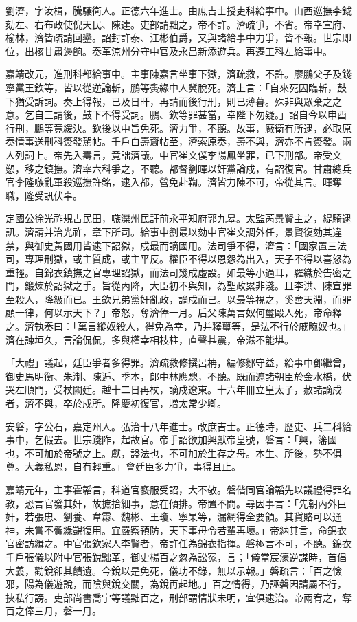 \begin{pinyinscope}
劉濟，字汝楫，騰驤衛人。正德六年進士。由庶吉士授吏科給事中。山西巡撫李鉞劾左、右布政使倪天民、陳達。吏部請黜之，帝不許。濟疏爭，不省。帝幸宣府、榆林，濟皆疏請回鑾。詔封許泰、江彬伯爵，又與諸給事中力爭，皆不報。世宗即位，出核甘肅邊餉。奏革涼州分守中官及永昌新添遊兵。再遷工科左給事中。

嘉靖改元，進刑科都給事中。主事陳嘉言坐事下獄，濟疏救，不許。廖鵬父子及錢寧黨王欽等，皆以從逆論斬，鵬等夤緣中人冀脫死。濟上言：「自來死囚臨斬，鼓下猶受訴詞。奏上得報，已及日旰，再請而後行刑，則已薄暮。殊非與眾棄之之意。乞自三請後，鼓下不得受詞。鵬、欽等罪甚當，幸陛下勿疑。」詔自今以申酉行刑，鵬等竟緩決。欽後以中旨免死。濟力爭，不聽。故事，廠衛有所逮，必取原奏情事送刑科簽發駕帖。千戶白壽齎帖至，濟索原奏，壽不與，濟亦不肯簽發。兩人列詞上。帝先入壽言，竟詘濟議。中官崔文僕李陽鳳坐罪，已下刑部。帝受文愬，移之鎮撫。濟率六科爭之，不聽。都督劉暉以奸黨論戍，有詔復官。甘肅總兵官李隆嗾亂軍殺巡撫許銘，逮入都，營免赴鞫。濟皆力陳不可，帝從其言。暉奪職，隆受訊伏辜。

定國公徐光祚規占民田，嗾灤州民訐前永平知府郭九皋。太監芮景賢主之，緹騎逮訊。濟請并治光祚，章下所司。給事中劉最以劾中官崔文調外任，景賢復劾其違禁，與御史黃國用皆逮下詔獄，戍最而謫國用。法司爭不得，濟言：「國家置三法司，專理刑獄，或主質成，或主平反。權臣不得以恩怨為出入，天子不得以喜怒為重輕。自錦衣鎮撫之官專理詔獄，而法司幾成虛設。如最等小過耳，羅織於告密之門，鍛煉於詔獄之手。旨從內降，大臣初不與知，為聖政累非淺。且李洪、陳宣罪至殺人，降級而已。王欽兄弟黨奸亂政，謫戍而已。以最等視之，奚啻天淵，而罪顧一律，何以示天下？」帝怒，奪濟俸一月。后父陳萬言奴何璽毆人死，帝命釋之。濟執奏曰：「萬言縱奴殺人，得免為幸，乃并釋璽等，是法不行於戚畹奴也。」濟在諫垣久，言論侃侃，多與權幸相枝柱，直聲甚震，帝滋不能堪。

「大禮」議起，廷臣爭者多得罪。濟疏救修撰呂柟，編修鄒守益，給事中鄧繼曾，御史馬明衡、朱淛、陳逅、季本，郎中林應驄，不聽。既而遮諸朝臣於金水橋，伏哭左順門，受杖闕廷。越十二日再杖，謫戍遼東。十六年冊立皇太子，赦諸謫戍者，濟不與，卒於戍所。隆慶初復官，贈太常少卿。

安磐，字公石，嘉定州人。弘治十八年進士。改庶吉士。正德時，歷吏、兵二科給事中，乞假去。世宗踐阼，起故官。帝手詔欲加興獻帝皇號，磐言：「興，籓國也，不可加於帝號之上。獻，謚法也，不可加於生存之母。本生、所後，勢不俱尊。大義私恩，自有輕重。」會廷臣多力爭，事得且止。

嘉靖元年，主事霍韜言，科道官褻服受詔，大不敬。磐偕同官論韜先以議禮得罪名教，恐言官發其奸，故摭拾細事，意在傾排。帝置不問。尋因事言：「先朝內外巨奸，若張忠、劉養、韋霦、魏彬、王瓊、寧杲等，漏網得全要領。其貨賂可以通神，未嘗不夤緣覬復用。宜嚴察預防，天下事毋令若輩再壞。」帝納其言，命錦衣官密訪緝之。中官張欽家人李賢者，帝許任為錦衣指揮。磐極言不可，不聽。錦衣千戶張儀以附中官張銳黜革，御史楊百之忽為訟冤，言；「儀當宸濠逆謀時，首倡大義，勸銳卻其饋遺。今銳以是免死，儀功不錄，無以示報。」磐疏言：「百之憸邪，陽為儀遊說，而陰與銳交關，為銳再起地。」百之情得，乃誣磐因請屬不行，挾私行謗。吏部尚書喬宇等議黜百之，刑部謂情狀未明，宜俱逮治。帝兩宥之，奪百之俸三月，磐一月。


\end{pinyinscope}
